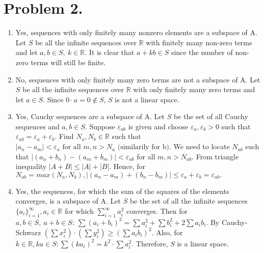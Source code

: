 \documentclass[11pt]{amsart}
\newcommand{\field}[1]{\mathbb{#1}}
\begin{document}
\section*{Problem 2.}
\begin{enumerate}
\item Yes, sequences with only finitely many nonzero elements are a
  subspace of A. Let $S$ be all the infinite sequences over
  $\field{R}$ with finitely many non-zero terms and let $a,b \in S, \
  k \in \field{R}$. It is clear that $a+kb \in S$ since the number of
  non-zero terms will still be finite. 

\item No, sequences with only finitely many zero terms are not a
  subspace of A. Let $S$ be all the infinite sequences over
  $\field{R}$ with only finitely many zero terms and let $a \in
  S$. Since $0 \cdot a=0\not \in S$, $S$ is not a linear space.
  
\item Yes, Cauchy sequences are a subspace of A. Let $S$ be the set of
  all Cauchy sequences and $a,b \in S$. Suppose $\varepsilon_{ab}$ is
  given and choose $\varepsilon_{a},\varepsilon_{b} >0$ such that
  $\varepsilon_{ab} = \varepsilon_a + \varepsilon_b.$ Find $N_a,N_b\in
  \field{R}$ such that $|a_n - a_m| < \varepsilon_a \textrm{ for all }
  m,n > N_a\textrm{ (similarily for b)}$. We need to locate $N_{ab}$
  such that $|(a_n + b_n) - (a_m + b_m)| < \varepsilon_{ab}$ for all
  $m,n > N_{ab}$. From triangle inequality $|A+B| \leq |A| + |B|$.
  Hence, for $N_{ab} = max(N_a, N_b), |(a_n-a_m) + (b_n-b_m)| \leq
  \varepsilon_a + \varepsilon_b = \varepsilon_{ab}.$

\item Yes, the sequences, for which the sum of the squares of the
  elements converges, is a subspace of A. Let $S$ be the set of all the
  infinite sequences $ \{a_i\}_{i=1}^{\infty}, a_i \in \field{R}$ for
  which $\sum_{i=1}^\infty a_i^2$ converges.  Then for $a,b \in S,\
  a+b \in S: \ \sum (a_i + b_i)^2 = \sum a_i^2 + \sum b_i^2 + 2 \sum
  a_ib_i$. By Cauchy-Schwarz $(\sum x_i^2)\cdot(\sum y_i^2) \geq (\sum
  a_ib_i)^2$. Also, for $k \in \field{R}, ka \in S: \sum (ka_i)^2 =
  k^2 \cdot \sum a_i^2$. Therefore, $S$ is a linear space.

\end{enumerate}
\end{document}
